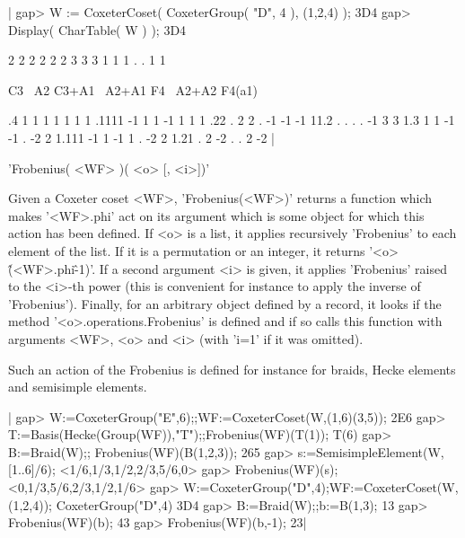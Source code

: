 |    gap> W := CoxeterCoset( CoxeterGroup( "D", 4 ), (1,2,4) );
    3D4
    gap> Display( CharTable( W ) );
    3D4
    
           2  2   2     2      2  2      3      3
           3  1   1     1      .  .      1      1
    
             C3 ~A2 C3+A1 ~A2+A1 F4 ~A2+A2 F4(a1)
    
    .4        1   1     1      1  1      1      1
    .1111    -1   1     1     -1  1      1      1
    .22       .   2     2      . -1     -1     -1
    11.2      .   .     .      . -1      3      3
    1.3       1   1    -1     -1  .     -2      2
    1.111    -1   1    -1      1  .     -2      2
    1.21      .   2    -2      .  .      2     -2
    |


'Frobenius( <WF> )( <o> [, <i>])'

Given  a  Coxeter  coset  <WF>,  'Frobenius(<WF>)' returns a function which
makes  '<WF>.phi' act on its  argument which is some  object for which this
action  has  been  defined.  If  <o>  is  a  list,  it  applies recursively
'Frobenius'  to each  element of  the list.  If it  is a  permutation or an
integer,  it  returns  '<o>\^(<WF>.phi\^-1)'.  If  a second argument <i> is
given,  it  applies  'Frobenius'  raised  to  the  <i>-th  power  (this  is
convenient  for instance to apply the inverse of 'Frobenius'). Finally, for
an   arbitrary  object  defined  by  a  record,  it  looks  if  the  method
'<o>.operations.Frobenius'  is defined and  if so calls  this function with
arguments <WF>, <o> and <i> (with 'i=1' if it was omitted).

Such  an action of the Frobenius is  defined for instance for braids, Hecke
elements and semisimple elements.

|    gap> W:=CoxeterGroup("E",6);;WF:=CoxeterCoset(W,(1,6)(3,5));
    2E6
    gap> T:=Basis(Hecke(Group(WF)),"T");;Frobenius(WF)(T(1));
    T(6)
    gap> B:=Braid(W);; Frobenius(WF)(B(1,2,3));
    265
    gap> s:=SemisimpleElement(W,[1..6]/6);
    <1/6,1/3,1/2,2/3,5/6,0>
    gap> Frobenius(WF)(s);
    <0,1/3,5/6,2/3,1/2,1/6>
    gap> W:=CoxeterGroup("D",4);WF:=CoxeterCoset(W,(1,2,4));
    CoxeterGroup("D",4)
    3D4
    gap> B:=Braid(W);;b:=B(1,3);
    13
    gap> Frobenius(WF)(b);
    43
    gap> Frobenius(WF)(b,-1);
    23|


